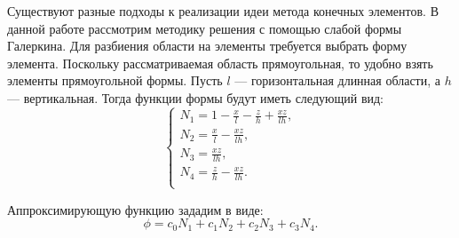 \documentclass[12pt, a4paper]{article}
\begin{document}
Существуют разные подходы к реализации идеи метода конечных элементов. В данной работе рассмотрим методику решения с помощью слабой формы Галеркина. Для разбиения области на элементы требуется выбрать форму элемента. Поскольку рассматриваемая область прямоугольная, то удобно взять элементы прямоугольной формы. Пусть $l$ --- горизонтальная длинная области, а $h$ --- вертикальная. Тогда функции формы будут иметь следующий вид:
\begin{equation}
	\begin{cases}
		N_1 = 1 - \frac{x}{l} - \frac{z}{h} + \frac{x  z}{l  h}, \\
		N_2 = \frac{x}{l} - \frac{x  z}{l  h}, \\
		N_3 = \frac{x  z}{l h}, \\
		N_4 = \frac{z}{h} - \frac{x  z}{l  h}. \\
	\end{cases}
\label{form-func}
\end{equation}

Аппроксимирующую функцию зададим в виде:
\begin{equation*}
	\phi = c_0 N_1 + c_1 N_2 + c_2 N_3 + c_3 N_4.
\end{equation*}
\end{document}
